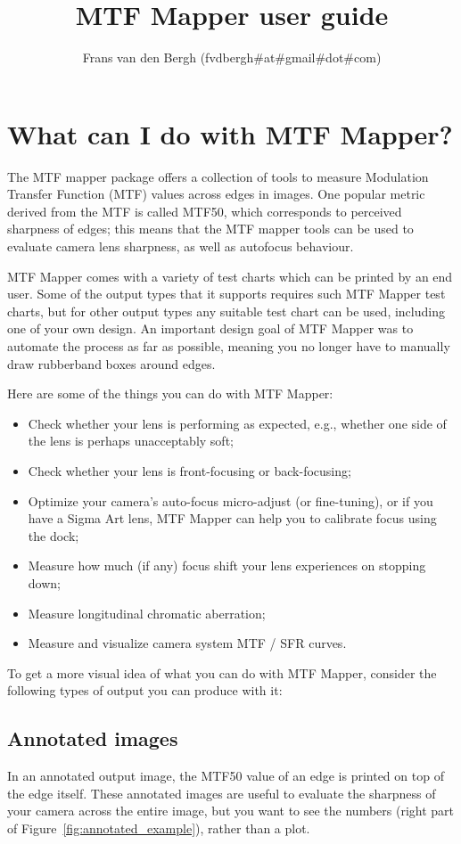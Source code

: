 \documentclass[a4paper]{article}
\title{MTF Mapper user guide}
\author{Frans van den Bergh (fvdbergh\#at\#gmail\#dot\#com)}
\begin{document}
\maketitle

\tableofcontents

\newpage

\section{What can I do with MTF Mapper?}
\label{sec:overview}
The MTF mapper package offers a collection of tools to measure Modulation
Transfer Function (MTF) values across edges in images. One popular metric
derived from the MTF is called MTF50, which corresponds to perceived 
sharpness of edges; this means that the MTF mapper tools can be used to 
evaluate camera lens sharpness, as well as autofocus behaviour.

MTF Mapper comes with a variety of test charts which can be printed by an
end user.  Some of the output types that it supports requires such MTF
Mapper test charts, but for other output types any suitable test chart can
be used, including one of your own design.  An important design goal of MTF
Mapper was to automate the process as far as possible, meaning you no longer
have to manually draw rubberband boxes around edges.

Here are some of the things you can do with MTF Mapper:
\begin{itemize}
\item
Check whether your lens is performing as expected, e.g., whether one side of
the lens is perhaps unacceptably soft;
\item
Check whether your lens is front-focusing or back-focusing;
\item
Optimize your camera's auto-focus micro-adjust (or fine-tuning), or if you
have a Sigma Art lens, MTF Mapper can help you to calibrate focus using the
dock;
\item 
Measure how much (if any) focus shift your lens experiences on stopping
down;
\item
Measure longitudinal chromatic aberration;
\item
Measure and visualize camera system MTF / SFR curves.
\end{itemize}

To get a more visual idea of what you can do with MTF Mapper, consider the
following types of output you can produce with it:
\subsection{Annotated images}
\label{sec:annotated_images}
In an annotated output image, the MTF50 value of an edge is printed on top
of the edge itself. These annotated images are useful to evaluate the sharpness
of your camera across the entire image, but you want to see the numbers
(right part of Figure~\ref{fig:annotated_example}), rather than a plot.
\end{document}

